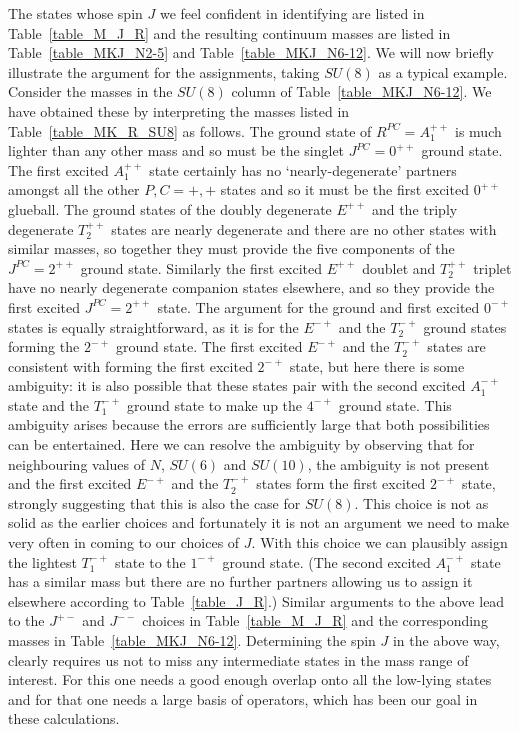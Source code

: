 \documentclass[12pt]{article}
\begin{document}
The states whose spin $J$  we feel confident in identifying are listed in
Table~\ref{table_M_J_R} and the resulting continuum masses are listed in
Table~\ref{table_MKJ_N2-5} and Table~\ref{table_MKJ_N6-12}.
We will now briefly illustrate the argument for the assignments,
taking $SU(8)$ as a typical example. Consider the masses in the $SU(8)$ column of
Table~\ref{table_MKJ_N6-12}. We have obtained these by interpreting the masses listed in
Table~\ref{table_MK_R_SU8} as follows. The ground state of $R^{PC}=A_1^{++}$ is much lighter than
any other mass and so must be the singlet $J^{PC}=0^{++}$ ground state. The first excited
$A_1^{++}$ state certainly has no `nearly-degenerate' partners amongst all the other $P,C=+,+$
states and so it must be the first excited $0^{++}$ glueball. The ground states of the
doubly degenerate $E^{++}$ and the triply degenerate $T_2^{++}$ states are nearly degenerate
and there are no other states with similar masses, so together they must provide the
five components of the $J^{PC}=2^{++}$ ground state. Similarly the first excited
$E^{++}$ doublet and $T_2^{++}$ triplet have no nearly degenerate companion states elsewhere,
and so they provide the first excited $J^{PC}=2^{++}$ state. The argument for the
ground and first excited $0^{-+}$ states is equally straightforward, as it is for
the $E^{-+}$ and the $T_2^{-+}$ ground states forming the $2^{-+}$ ground state.
The first excited $E^{-+}$ and the $T_2^{-+}$ states are consistent with forming the
first excited  $2^{-+}$ state, but here there is some ambiguity: it is also possible that
these states pair with the second excited $A_1^{-+}$ state and the $T_1^{-+}$ ground state
to make up the  $4^{-+}$ ground state. This ambiguity arises because the errors are
sufficiently large that both possibilities can be entertained. Here we can resolve the
ambiguity by observing that for neighbouring values of $N$, $SU(6)$ and  $SU(10)$,
the ambiguity is not present and the first excited $E^{-+}$ and the $T_2^{-+}$ states
form the first excited  $2^{-+}$ state, strongly suggesting that this is also the
case for $SU(8)$. This choice is not as solid as the earlier choices and fortunately
it is not an argument we need to make very often in coming to our choices of $J$.
With this choice we can plausibly assign the lightest $T_1^{-+}$ state
to the $1^{-+}$ ground state. (The second excited $A_1^{-+}$ state has a similar mass
but there are no further partners allowing us to assign it elsewhere according
to Table~\ref{table_J_R}.) Similar arguments to the above lead to the $J^{+-}$
and $J^{--}$ choices in  Table~\ref{table_M_J_R} and the corresponding masses
in Table~\ref{table_MKJ_N6-12}.
Determining the spin $J$ in the above way, clearly requires us not to miss any
intermediate states in the mass range of interest. For this one needs a
good enough overlap onto all the low-lying states and for that one needs a large
basis of operators, which has been our goal in these calculations. 
\end{document}
